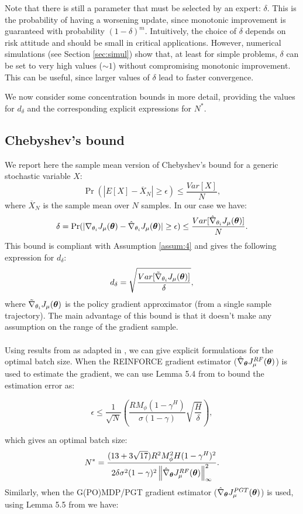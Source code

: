 Note that there is still a parameter that must be selected by an expert: $\delta$. This is the probability of having a worsening update, since monotonic improvement is guaranteed with probability $(1-\delta)^m$. Intuitively, the choice of $\delta$ depends on risk attitude and should be small in critical applications. However, numerical simulations (see Section \ref{sec:simul}) show that, at least for simple problems, $\delta$ can be set to very high values ($\sim 1$) without compromising monotonic improvement. This can be useful, since larger values of $\delta$ lead to faster convergence.

We now consider some concentration bounds in more detail, providing the values for $d_{\delta}$ and the corresponding explicit expressions for $N^*$.

\subsection{Chebyshev's bound}\label{sec:chebyshev}
We report here the sample mean version of Chebyshev's bound for a generic stochastic variable $X$:
\[
	\Pr(|E[X] - \overline{X}_N| \geq \epsilon) \leq \frac{Var[X]}{N},
\]
where $\overline{X}_N$ is the sample mean over $N$ samples.
In our case we have:
\[
	\delta = \Pr(|\gradJ{\theta_i} - \gradApp{\theta_i}| 
		\geq \epsilon) \leq \frac{Var[\gradApp{\theta_i}]}{N}.
\]
This bound is compliant with Assumption \ref{assum:4} and gives the following expression for $d_\delta$:
\[
d_\delta = \sqrt{\frac{Var[\gradSim{\theta_i}]}{\delta}},
\]
where $\gradSim{\theta_i}$ is the policy gradient approximator (from a single sample trajectory).
The main advantage of this bound is that it doesn't make any assumption on the range of the gradient sample.
\paragraph{}
Using results from \cite{DBLP:journals/nn/ZhaoHNS12} as adapted in \cite{NIPS2013_5186}, we can give explicit formulations for the optimal batch size.
When the REINFORCE \cite{Williams1992} gradient estimator ($\gradRF{\vtheta}$) is used to estimate the gradient, we can use Lemma 5.4 from \cite{NIPS2013_5186} to bound the estimation error as:

\[
\epsilon \leq \frac{1}{\sqrt{N}}\left(\frac{RM_{\phi}(1-\gamma^H)}
				{\sigma(1-\gamma)}\sqrt{\frac{H}{\delta}}\right),
\]

which gives an optimal batch size:
\[
N^* = \frac{(13+3\sqrt{17})R^2M_{\phi}^2H(1-\gamma^H)^2}
	 		{2\delta\sigma^2(1-\gamma)^2
	 			\norm[\infty]{\gradRF{\vtheta}}^2}.
\]
Similarly, when the G(PO)MDP/PGT gradient estimator ($\gradPGT{\vtheta}$) is used, using Lemma 5.5 from \cite{NIPS2013_5186} we have:

